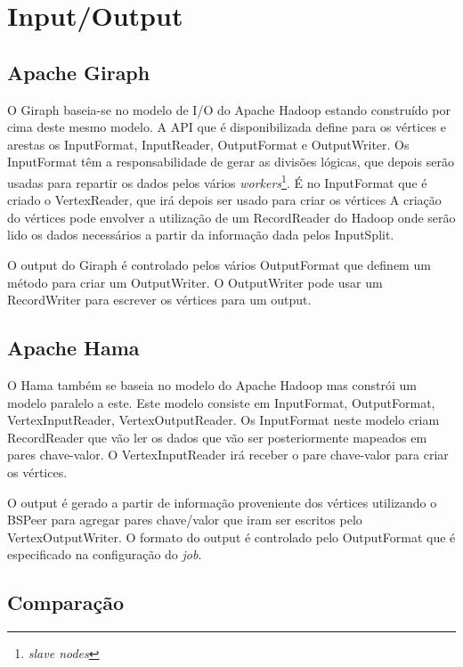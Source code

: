 \newpage
\section*{Input/Output}

\subsection*{Apache Giraph}
O Giraph baseia-se no modelo de I/O do Apache Hadoop estando construído por cima deste mesmo modelo.
A API que é disponibilizada define para os vértices e arestas os InputFormat, InputReader, OutputFormat e OutputWriter.
Os InputFormat têm a responsabilidade de gerar as divisões lógicas, que depois serão usadas para repartir os dados pelos vários
\textit{workers}\footnote{\textit{slave nodes}}. É no InputFormat que é criado o VertexReader, que irá depois ser usado para criar os vértices
A criação do vértices pode envolver a utilização de um RecordReader do Hadoop onde serão lido os dados necessários a partir da informação dada pelos
InputSplit.

O output do Giraph é controlado pelos vários OutputFormat que definem um método para criar um OutputWriter. O OutputWriter pode usar um RecordWriter
para escrever os vértices para um output.

\subsection*{Apache Hama}

O Hama também se baseia no modelo do Apache Hadoop mas constrói um modelo paralelo a este.
Este modelo consiste em InputFormat, OutputFormat, VertexInputReader, VertexOutputReader. Os InputFormat neste modelo criam RecordReader 
que vão ler os dados que vão ser posteriormente mapeados em pares chave-valor. O VertexInputReader irá receber o pare chave-valor para criar os
vértices.

O output é gerado a partir de informação proveniente dos vértices utilizando o BSPeer para agregar pares chave/valor que iram
ser escritos pelo VertexOutputWriter. O formato do output é controlado pelo OutputFormat que é especificado na
configuração do \textit{job}.


\subsection*{Comparação}

